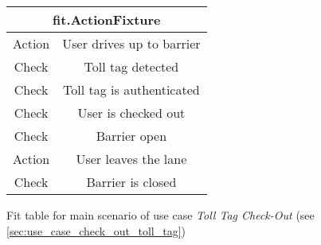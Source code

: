 \begin{figure}[H]
\begin{centering}
\begin{tabular}{|c|c|}
\hline 
\multicolumn{2}{|c|}{fit.ActionFixture}\tabularnewline
\hline 
Action & User drives up to barrier\tabularnewline
\hline 
Check & Toll tag detected\tabularnewline
\hline 
Check & Toll tag is authenticated\tabularnewline
\hline 
Check & User is checked out\tabularnewline
\hline 
Check & Barrier open\tabularnewline
\hline 
Action & User leaves the lane\tabularnewline
\hline 
Check & Barrier is closed\tabularnewline
\hline 
\end{tabular}
\caption{Fit table for main scenario of use case \emph{Toll Tag Check-Out} (see \autoref{sec:use_case_check_out_toll_tag})}
\end{centering}
\end{figure}